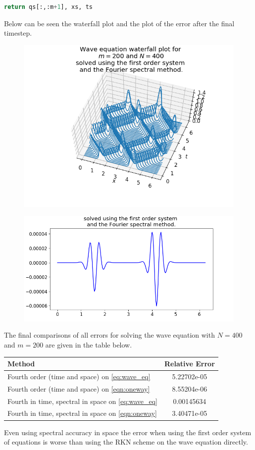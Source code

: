 \documentclass[final,oneside,onecolumn]{article}
\begin{document}
\begin{enumerate}
\begin{enumerate}
\begin{lstlisting}[language=Python]
	return qs[:,:m+1], xs, ts 
\end{lstlisting}
Below can be seen the waterfall plot and the plot of the error after the final timestep.
\begin{figure}[H]
	\centering
	\includegraphics[width=.8\linewidth]{hw6_p5e_waterfall}
\end{figure}
\begin{figure}[H]
	\centering
	\includegraphics[width=.8\linewidth]{hw6_p5e_error}
\end{figure}
The final comparisons of all errors for solving the wave equation with $N=400$ and $m=200$ are given in the table below.

\begin{center}
	\begin{tabular}{|l|c|}
		\hline
		\textbf{Method} & \textbf{Relative Error}\\ \hline
		Fourth order (time and space) on \eqref{eq:wave_eq} & 5.22702e-05\\ \hline
		Fourth order (time and space) on \eqref{eqn:oneway} & 8.55204e-06\\ \hline
		Fourth in time, spectral in space on \eqref{eq:wave_eq} & 0.00145634\\ \hline
		Fourth in time, spectral in space on \eqref{eqn:oneway} & 3.40471e-05\\
		\hline
	\end{tabular}
\end{center}

Even using spectral accuracy in space the error when using the first order system of equations is worse than using the RKN scheme on the wave equation directly.


\end{enumerate}

\end{enumerate}
\end{document}
